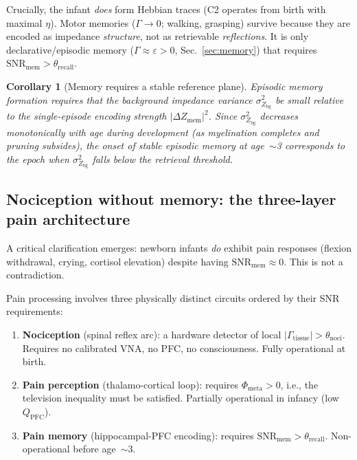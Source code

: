 \documentclass[aps,pre,twocolumn,superscriptaddress,floatfix]{revtex4-2}
\newtheorem{corollary}{Corollary}
\begin{document}
Crucially, the infant \emph{does} form Hebbian traces
(C2 operates from birth with maximal $\eta$).
Motor memories ($\Gamma\to 0$; walking, grasping) survive
because they are encoded as impedance \emph{structure},
not as retrievable \emph{reflections}.
It is only declarative/episodic memory
($\Gamma\approx\varepsilon>0$, Sec.~\ref{sec:memory})
that requires $\mathrm{SNR}_{\text{mem}}>\theta_{\text{recall}}$.

\begin{corollary}[Memory requires a stable reference plane]
Episodic memory formation requires that the background
impedance variance $\sigma^2_{Z_{\text{bg}}}$ be small
relative to the single-episode encoding strength
$|\Delta Z_{\text{mem}}|^2$.
Since $\sigma^2_{Z_{\text{bg}}}$ decreases monotonically
with age during development (as myelination completes and
pruning subsides), the onset of stable episodic memory
at age~$\sim$3 corresponds to the epoch when
$\sigma^2_{Z_{\text{bg}}}$ falls below the retrieval
threshold.
\end{corollary}

\subsection{Nociception without memory: the three-layer
  pain architecture}
\label{sec:infant-pain}

A critical clarification emerges: newborn infants
\emph{do} exhibit pain responses (flexion withdrawal,
crying, cortisol elevation) despite having
$\mathrm{SNR}_{\text{mem}}\approx 0$.
This is not a contradiction.

Pain processing involves three physically distinct
circuits ordered by their SNR requirements:
\begin{enumerate}
  \item \textbf{Nociception} (spinal reflex arc):
    a hardware detector of local $|\Gamma_{\text{tissue}}|>\theta_{\text{noci}}$.
    Requires no calibrated VNA, no PFC, no consciousness.
    Fully operational at birth.
  \item \textbf{Pain perception} (thalamo-cortical loop):
    requires $\Phi_{\text{meta}}>0$, i.e., the television
    inequality must be satisfied.
    Partially operational in infancy (low $Q_{\text{PFC}}$).
  \item \textbf{Pain memory} (hippocampal-PFC encoding):
    requires $\mathrm{SNR}_{\text{mem}}>\theta_{\text{recall}}$.
    Non-operational before age~$\sim$3.
\end{enumerate}
\end{document}
